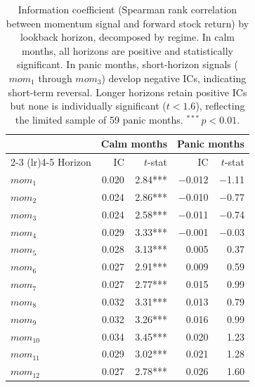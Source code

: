 \begin{table}[H]
\centering
\small
\begin{tabular}{l r r r r}
\toprule
 & \multicolumn{2}{c}{Calm months} & \multicolumn{2}{c}{Panic months} \\
\cmidrule(lr){2-3} \cmidrule(lr){4-5}
Horizon & IC & $t$-stat & IC & $t$-stat \\
\midrule
$mom_1$  &  0.020 &  2.84*** & $-$0.012 & $-$1.11 \\
$mom_2$  &  0.024 &  2.86*** & $-$0.010 & $-$0.77 \\
$mom_3$  &  0.024 &  2.58*** & $-$0.011 & $-$0.74 \\
$mom_4$  &  0.029 &  3.33*** & $-$0.001 & $-$0.03 \\
$mom_5$  &  0.028 &  3.13*** &   0.005 &   0.37 \\
$mom_6$  &  0.027 &  2.91*** &   0.009 &   0.59 \\
$mom_7$  &  0.027 &  2.77*** &   0.015 &   0.99 \\
$mom_8$  &  0.032 &  3.31*** &   0.013 &   0.79 \\
$mom_9$  &  0.032 &  3.26*** &   0.016 &   0.99 \\
$mom_{10}$ &  0.034 &  3.45*** &   0.020 &   1.23 \\
$mom_{11}$ &  0.029 &  3.02*** &   0.021 &   1.28 \\
$mom_{12}$ &  0.027 &  2.78*** &   0.026 &   1.60 \\
\bottomrule
\end{tabular}
\caption{Information coefficient (Spearman rank correlation between momentum signal and forward stock return) by lookback horizon, decomposed by regime. In calm months, all horizons are positive and statistically significant. In panic months, short-horizon signals ($mom_1$ through $mom_3$) develop negative ICs, indicating short-term reversal. Longer horizons retain positive ICs but none is individually significant ($t < 1.6$), reflecting the limited sample of 59 panic months. $^{***}$\,$p<0.01$.}
\label{tab:ic_rotation}
\end{table}

